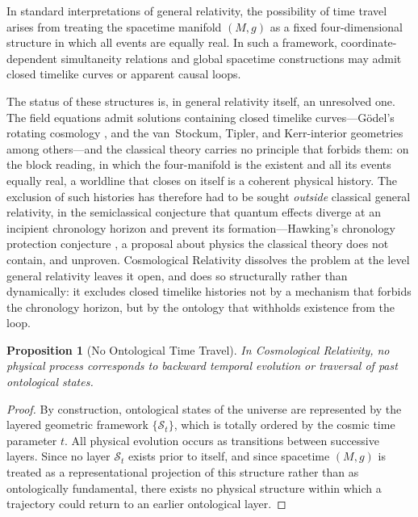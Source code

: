 \documentclass[11pt,a4paper]{article}
\theoremstyle{plain}
\newtheorem{proposition}{Proposition}
\theoremstyle{definition}
\theoremstyle{remark}
\begin{document}
In standard interpretations of general relativity, the possibility of time travel arises from treating the spacetime manifold $(M,g)$ as a fixed four-dimensional structure in which all events are equally real. In such a framework, coordinate-dependent simultaneity relations and global spacetime constructions may admit closed timelike curves \cite{Godel1949} or apparent causal loops.

The status of these structures is, in general relativity itself, an unresolved one. The field equations admit solutions containing closed timelike curves---G\"odel's rotating cosmology \cite{Godel1949}, and the van~Stockum, Tipler, and Kerr-interior geometries among others---and the classical theory carries no principle that forbids them: on the block reading, in which the four-manifold is the existent and all its events equally real, a worldline that closes on itself is a coherent physical history. The exclusion of such histories has therefore had to be sought \emph{outside} classical general relativity, in the semiclassical conjecture that quantum effects diverge at an incipient chronology horizon and prevent its formation---Hawking's chronology protection conjecture \cite{Hawking1992}, a proposal about physics the classical theory does not contain, and unproven. Cosmological Relativity dissolves the problem at the level general relativity leaves it open, and does so structurally rather than dynamically: it excludes closed timelike histories not by a mechanism that forbids the chronology horizon, but by the ontology that withholds existence from the loop.

\begin{proposition}[No Ontological Time Travel]
In Cosmological Relativity, no physical process corresponds to backward temporal evolution or traversal of past ontological states.
\end{proposition}

\begin{proof}
By construction, ontological states of the universe are represented by the layered geometric framework $\{\mathcal{S}_t\}$, which is totally ordered by the cosmic time parameter $t$. All physical evolution occurs as transitions between successive layers. Since no layer $\mathcal{S}_t$ exists prior to itself, and since spacetime $(M,g)$ is treated as a representational projection of this structure rather than as ontologically fundamental, there exists no physical structure within which a trajectory could return to an earlier ontological layer.
\end{proof}
\end{document}
